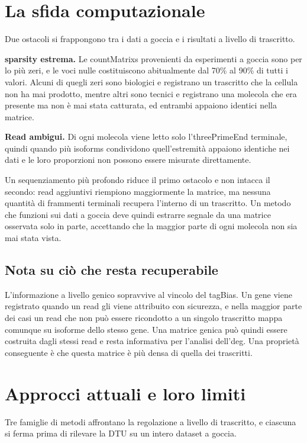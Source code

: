 \section{La sfida computazionale}
Due ostacoli si frappongono tra i dati a goccia e i risultati a livello di trascritto.

\textbf{\gls{sparsity} estrema.} Le \glspl{countMatrix} provenienti da esperimenti a goccia sono per lo più zeri, e le voci nulle costituiscono abitualmente dal 70\% al 90\% di tutti i valori. Alcuni di quegli zeri sono biologici e registrano un trascritto che la cellula non ha mai prodotto, mentre altri sono tecnici e registrano una molecola che era presente ma non è mai stata catturata, ed entrambi appaiono identici nella matrice.

\textbf{Read ambigui.} Di ogni molecola viene letto solo l'\gls{threePrimeEnd} terminale, quindi quando più \glspl{isoform} condividono quell'estremità appaiono identiche nei dati e le loro proporzioni non possono essere misurate direttamente.

Un sequenziamento più profondo riduce il primo ostacolo e non intacca il secondo: read aggiuntivi riempiono maggiormente la matrice, ma nessuna quantità di frammenti terminali recupera l'interno di un trascritto. Un metodo che funzioni sui dati a goccia deve quindi estrarre segnale da una matrice osservata solo in parte, accettando che la maggior parte di ogni molecola non sia mai stata vista.

\subsection*{Nota su ciò che resta recuperabile}

L'informazione a livello genico sopravvive al vincolo del \gls{tagBias}. Un gene viene registrato quando un read gli viene attribuito con sicurezza, e nella maggior parte dei casi un read che non può essere ricondotto a un singolo trascritto mappa comunque su isoforme dello stesso gene. Una matrice genica può quindi essere costruita dagli stessi read e resta informativa per l'analisi dell'\gls{deg}. Una proprietà conseguente è che questa matrice è più densa di quella dei trascritti.

\section{Approcci attuali e loro limiti}
Tre famiglie di metodi affrontano la regolazione a livello di trascritto, e ciascuna si ferma prima di rilevare la DTU su un intero dataset a goccia.

